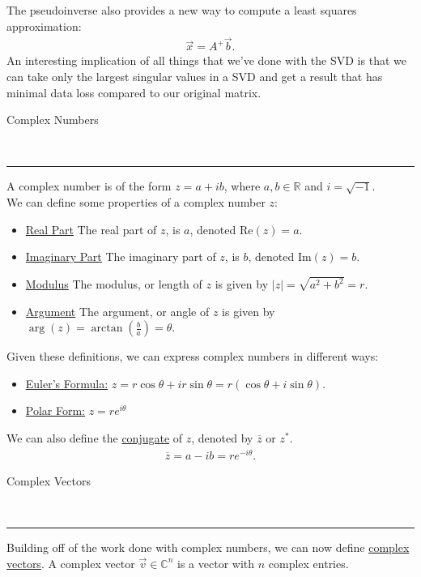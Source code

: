 \documentclass{article}
\newcommand{\header}[1]{\begin{large}\noindent #1\end{large}\\\rule{\textwidth}{0.5pt}}
\newcommand{\gap}{\medskip\\}
\newcommand{\sheader}[1]{\underline{#1:}}
\begin{document}
The pseudoinverse also provides a new way to compute a least squares approximation:
\begin{align*}
    \vec{x} = A^+ \vec{b}.
\end{align*}
An interesting implication of all things that we've done with the SVD is that we can take only
the largest singular values in a SVD and get a result that has minimal data loss compared 
to our original matrix.
\pagebreak

\header{Complex Numbers}

A complex number is of the form $z = a + ib$, where $a,b \in \mathbb{R}$ and $i = \sqrt{-1}$.
\gap
We can define some properties of a complex number $z$:
\begin{itemize}
    \item \underline{Real Part} The real part of $z$, is $a$, denoted $\textrm{Re}(z) = a$.
    \item \underline{Imaginary Part} The imaginary part of $z$, is $b$, denoted $\textrm{Im}(z) = b$.
    \item \underline{Modulus} The modulus, or length of $z$ is given by $|z| = \sqrt{a^2 + b^2} = r$.
    \item \underline{Argument} The argument, or angle of $z$ is given by $\arg(z) = \arctan\left(\frac{b}{a}\right) = \theta$.
\end{itemize}
Given these definitions, we can express complex numbers in different ways:
\begin{itemize}
    \item \sheader{Euler's Formula} $z = r \cos \theta + i r \sin \theta = r(\cos \theta + i \sin \theta)$.
    \item \sheader{Polar Form} $z = re^{i \theta}$
\end{itemize}
We can also define the \underline{conjugate} of $z$, denoted by $\overline{z}$ or $z^*$. 
\begin{align*}
    \overline{z} = a - ib = re^{-i \theta}.
\end{align*}

\header{Complex Vectors}
Building off of the work done with complex numbers, we can now define \underline{complex vectors}.
A complex vector $\vec{v} \in \mathbb{C}^n$ is a vector with $n$ complex entries.
\gap
\end{document}
